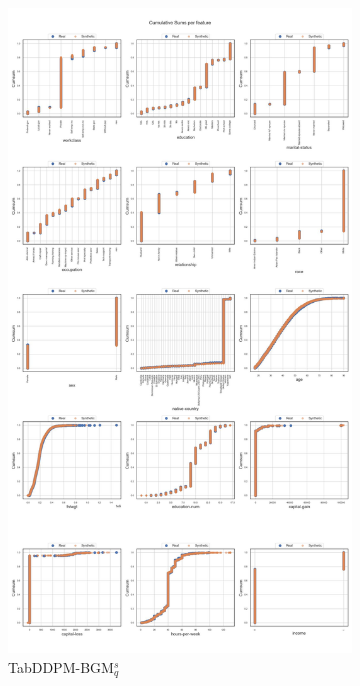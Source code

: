 \begin{landscape}
\begin{figure}[h]
		\hfill
		\begin{subfigure}{0.3\linewidth}
			\includegraphics[height=\textheight,width=\linewidth,keepaspectratio]{images/cumsums/tab-ddpm-bgm-simTune.jpg}
			\caption{TabDDPM-BGM$^{s}_q$}
		\end{subfigure}
		\hfill
		\begin{subfigure}{0.3\linewidth}

\end{subfigure}
\end{figure}
\end{landscape}
